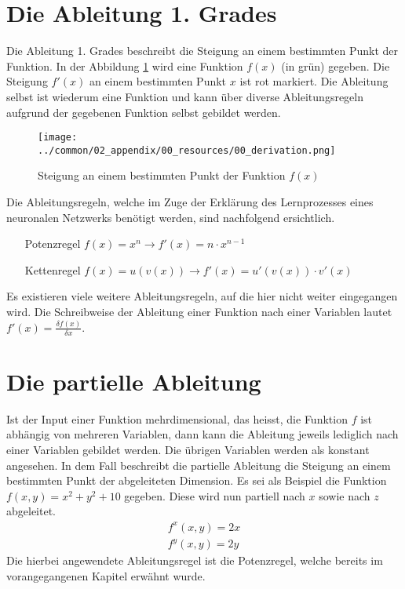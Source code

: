 \section{Die Ableitung 1. Grades}
Die Ableitung 1. Grades beschreibt die Steigung an einem bestimmten Punkt der Funktion. In der Abbildung \ref{fig:00_steigung_an_punkt}
wird eine Funktion $f(x)$ (in grün) gegeben. Die Steigung $f'(x)$ an einem bestimmten Punkt $x$ ist rot markiert.
Die Ableitung selbst ist wiederum eine Funktion und kann über diverse Ableitungsregeln aufgrund der gegebenen Funktion
selbst gebildet werden.
\begin{figure}[h!]
    \begin{center}
        \texttt{[image: ../common/02\_appendix/00\_resources/00\_derivation.png]}
    \end{center}
    \caption{Steigung an einem bestimmten Punkt der Funktion $f(x)$}
    \label{fig:00_steigung_an_punkt}
\end{figure}

Die Ableitungsregeln, welche im Zuge der Erklärung des Lernprozesses eines neuronalen Netzwerks benötigt werden,
sind nachfolgend ersichtlich.
\begin{itemize}
    \item[Potenzregel] $f(x) = x^n \longrightarrow f'(x) = n \cdot x^{n-1}$\label{abl:potenzregel}
    \item[Kettenregel] $f(x) = u(v(x)) \longrightarrow f'(x) = u'(v(x)) \cdot v'(x)$\label{abl:kettenregel}
\end{itemize}
Es existieren viele weitere Ableitungsregeln, auf die hier nicht weiter eingegangen wird.
Die Schreibweise der Ableitung einer Funktion nach einer Variablen lautet $f'(x) = \frac{\delta f(x)}{\delta x}$.

\section{Die partielle Ableitung}
Ist der Input einer Funktion mehrdimensional, das heisst, die Funktion $f$ ist abhängig von mehreren Variablen, dann
kann die Ableitung jeweils lediglich nach einer Variablen gebildet werden. Die übrigen Variablen werden als konstant
angesehen. In dem Fall beschreibt die partielle Ableitung die Steigung an einem bestimmten Punkt der abgeleiteten
Dimension. Es sei als Beispiel die Funktion $f(x, y) = x^2 + y^2 + 10$ gegeben. Diese wird nun partiell nach $x$ sowie
nach $z$ abgeleitet.
\begin{align}
    f^x(x, y) = 2x\\
    f^y(x, y) = 2y
\end{align}
Die hierbei angewendete Ableitungsregel ist die Potenzregel, welche bereits im vorangegangenen Kapitel erwähnt wurde.

